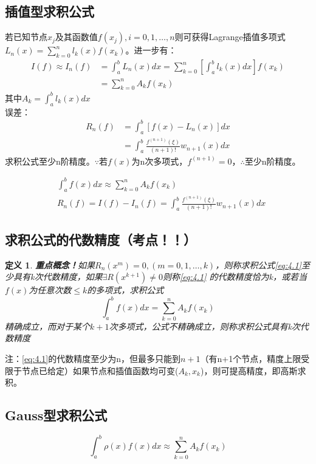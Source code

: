 \documentclass[a4paper]{article}
\newtheorem{definition}{定义}[section]
\begin{document}
\subsection{插值型求积公式}
若已知节点$x_j$及其函数值$f(x_j),i=0,1,\dots, n$则可获得Lagrange插值多项式$L_n(x)=\sum^n_{k=0}l_k(x)f(x_k)$。进一步有：
\begin{equation}
    \begin{split}
        I(f) \approx I_n(f) &= \int^b_aL_n(x)dx = \sum^n_{k=0}[\int^b_al_k(x)dx]f(x_k) \\
        &= \sum^n_{k=0}A_kf(x_k)
    \end{split}
\end{equation}
其中$A_k = \int^b_al_k(x)dx$\\
误差：
\begin{equation*}
    \begin{split}
        R_n(f)&=\int^b_a[f(x)-L_n(x)]dx \\
        &=\int^b_a\frac{f^{(n+1)}(\xi)}{(n+1)!}w_{n+1}(x)dx
    \end{split}
\end{equation*}
求积公式至少n阶精度。$\because $若$f(x)$为n次多项式，$f^{(n+1)}=0$，$\therefore $至少n阶精度。

\begin{align}
    &\int^b_a f(x)dx \approx \sum^n_{k=0}A_kf(x_k) \label{eq:4.1} \\
    &R_n(f) = I(f)-I_n(f) = \int^b_a\frac{f^{(n+1)}(\xi)}{(n+1)!}w_{n+1}(x)dx
\end{align}

\subsection{求积公式的代数精度\textbf{（考点！！）}}

\begin{definition}
    \textbf{重点概念！}如果$R_n(x^m)=0, (m=0,1,\dots, k)$，则称求积公式\ref{eq:4.1}至少具有k次代数精度，如果$\exists R(x^{k+1})\neq 0$则称\ref{eq:4.1}
    的代数精度恰为k，或若当$f(x)$为任意次数$\le k$的多项式，求积公式
    $$\int^b_af(x)dx = \sum^n_{k=0}A_kf(x_k)$$精确成立，而对于某个$k+1$次多项式，公式不精确成立，则称求积公式具有k次代数精度
\end{definition}

注：\ref{eq:4.1}的代数精度至少为n，但最多只能到$n+1$（有n+1个节点，精度上限受限于节点已给定）如果节点和插值函数均可变($A_k, x_k$)，则可提高精度，即高斯求积。

\subsection{Gauss型求积公式}
\begin{equation}
    \int^b_a\rho(x)f(x)dx \approx \sum^n_{k=0}A_kf(x_k)
    \label{eq:4.2}
\end{equation}
\end{document}
